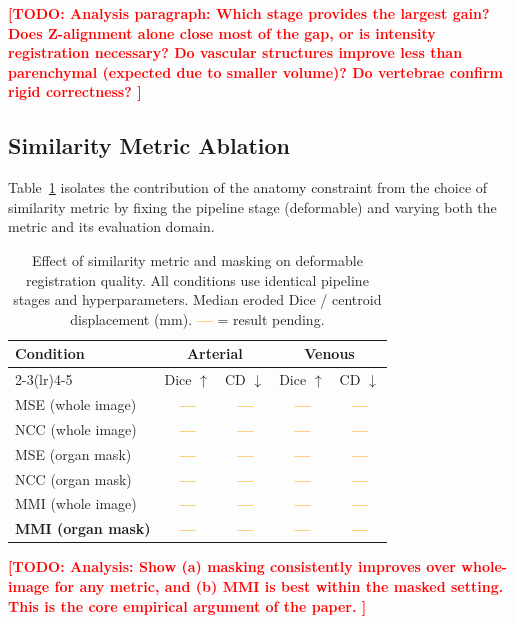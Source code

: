 \documentclass[10pt,twocolumn]{article}
\newcommand{\TODO}[1]{\textcolor{red}{\textbf{[TODO: #1]}}}
\newcommand{\BLANK}{\textcolor{orange}{\textbf{---}}}   %
\begin{document}
\TODO{%
  Analysis paragraph: Which stage provides the largest gain?
  Does Z-alignment alone close most of the gap, or is intensity
  registration necessary? Do vascular structures improve less than
  parenchymal (expected due to smaller volume)? Do vertebrae confirm
  rigid correctness?
}

\subsection{Similarity Metric Ablation}
\label{sec:metric_ablation}

Table~\ref{tab:metric} isolates the contribution of the anatomy
constraint from the choice of similarity metric by fixing the pipeline
stage (deformable) and varying both the metric and its evaluation
domain.

\begin{table}[t]
\centering
\caption{%
  Effect of similarity metric and masking on deformable registration
  quality. All conditions use identical pipeline stages and
  hyperparameters. Median eroded Dice / centroid displacement (mm).
  \BLANK{} = result pending.
}
\label{tab:metric}
\begin{tabular}{lcccc}
\toprule
\textbf{Condition} & \multicolumn{2}{c}{\textbf{Arterial}} &
                     \multicolumn{2}{c}{\textbf{Venous}} \\
\cmidrule(lr){2-3}\cmidrule(lr){4-5}
 & Dice $\uparrow$ & CD $\downarrow$ & Dice $\uparrow$ & CD $\downarrow$ \\
\midrule
MSE (whole image)     & \BLANK & \BLANK & \BLANK & \BLANK \\
NCC (whole image)     & \BLANK & \BLANK & \BLANK & \BLANK \\
MSE (organ mask)      & \BLANK & \BLANK & \BLANK & \BLANK \\
NCC (organ mask)      & \BLANK & \BLANK & \BLANK & \BLANK \\
MMI (whole image)     & \BLANK & \BLANK & \BLANK & \BLANK \\
\textbf{MMI (organ mask)} & \textbf{\BLANK} & \textbf{\BLANK} & \textbf{\BLANK} & \textbf{\BLANK} \\
\bottomrule
\end{tabular}
\end{table}

\TODO{%
  Analysis: Show (a) masking consistently improves over whole-image
  for any metric, and (b) MMI is best within the masked setting.
  This is the core empirical argument of the paper.
}
\end{document}
